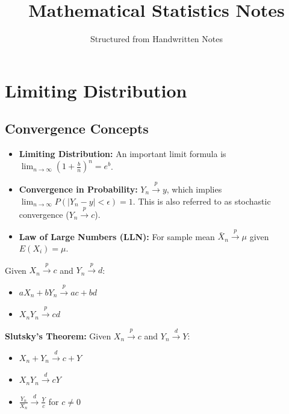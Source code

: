 \documentclass[12pt,a4paper]{article}
\title{\textbf{\color{mainblue} Mathematical Statistics Notes}}
\author{Structured from Handwritten Notes}
\date{}
\begin{document}
\maketitle
\tableofcontents
\newpage

\section{Limiting Distribution}

\subsection{Convergence Concepts}
\begin{itemize}
    \item \textbf{Limiting Distribution:} An important limit formula is
    $\lim_{n\rightarrow\infty}(1+\frac{b}{n})^n=e^b$.
    \item \textbf{Convergence in Probability:} $Y_n \xrightarrow{p} y$, which implies $\lim_{n\rightarrow\infty}P(|Y_n-y|<\epsilon)=1$. This is also referred to as stochastic convergence ($Y_n \xrightarrow{p} c$).
    \item \textbf{Law of Large Numbers (LLN):} For sample mean $\bar{X}_n \xrightarrow{p} \mu$ given $E(X_i)=\mu$.
\end{itemize}

\begin{thmbox}[title=Properties of Convergence]
Given $X_n \xrightarrow{p} c$ and $Y_n \xrightarrow{p} d$:
\begin{itemize}
    \item $aX_n + bY_n \xrightarrow{p} ac + bd$
    \item $X_n Y_n \xrightarrow{p} cd$
\end{itemize}
\textbf{Slutsky's Theorem:} Given $X_n \xrightarrow{p} c$ and $Y_n \xrightarrow{d} Y$:
\begin{itemize}
    \item $X_n + Y_n \xrightarrow{d} c + Y$
    \item $X_n Y_n \xrightarrow{d} cY$
    \item $\frac{Y_n}{X_n} \xrightarrow{d} \frac{Y}{c}$ for $c \ne 0$
\end{itemize}
\end{thmbox}
\end{document}
